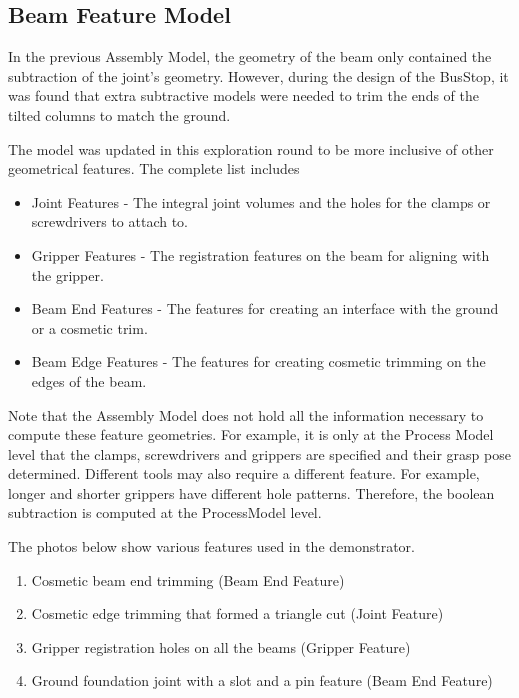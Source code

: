 \subsection{Beam Feature Model}
\label{subsection:exploration-4-beam-feature-model}

In the previous Assembly Model, the geometry of the beam only contained the subtraction of the joint's geometry. However, during the design of the BusStop, it was found that extra subtractive models were needed to trim the ends of the tilted columns to match the ground.

The model was updated in this exploration round to be more inclusive of other geometrical features. The complete list includes

\begin{itemize}
    \item Joint Features - The integral joint volumes and the holes for the clamps or screwdrivers to attach to.
    \item Gripper Features - The registration features on the beam for aligning with the gripper.
    \item Beam End Features - The features for creating an interface with the ground or a cosmetic trim.
    \item Beam Edge Features - The features for creating cosmetic trimming on the edges of the beam.
\end{itemize}

Note that the Assembly Model does not hold all the information necessary to compute these feature geometries. For example, it is only at the Process Model level that the clamps, screwdrivers and grippers are specified and their grasp pose determined. Different tools may also require a different feature. For example, longer and shorter grippers have different hole patterns. Therefore, the boolean subtraction is computed at the ProcessModel level.

The photos below show various features used in the demonstrator. 
\begin{enumerate}
    \item Cosmetic beam end trimming (Beam End Feature)
    \item Cosmetic edge trimming that formed a triangle cut  (Joint Feature)
    \item Gripper registration holes on all the beams (Gripper Feature)
    \item Ground foundation joint with a slot and a pin feature (Beam End Feature)
\end{enumerate}

